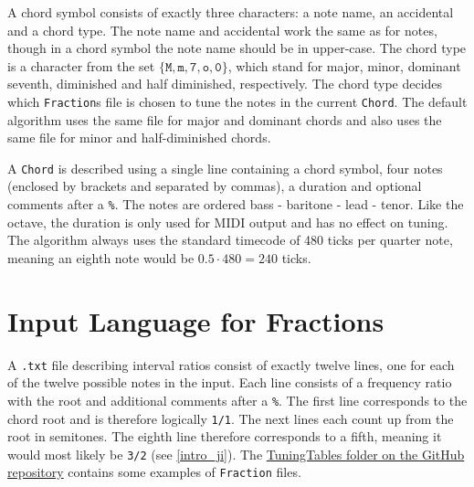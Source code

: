 \documentclass[a4paper]{article}
\begin{document}
\begin{appendices}
A chord symbol consists of exactly three characters: a note name, an accidental and a chord type. The note name and accidental work the same as for notes, though in a chord symbol the note name should be in upper-case. The chord type is a character from the set $\{\texttt{M}, \texttt{m}, \texttt{7}, \texttt{o}, \texttt{0}\}$, which stand for major, minor, dominant seventh, diminished and half diminished, respectively. The chord type decides which \texttt{Fraction}s file is chosen to tune the notes in the current \texttt{Chord}. The default algorithm uses the same file for major and dominant chords and also uses the same file for minor and half-diminished chords.

A \texttt{Chord} is described using a single line containing a chord symbol, four notes (enclosed by brackets and separated by commas), a duration and optional comments after a \texttt{\%}. The notes are ordered bass - baritone - lead - tenor. Like the octave, the duration is only used for MIDI output and has no effect on tuning. The algorithm always uses the standard \cite{dobrian_timing_2014} timecode of 480 ticks per quarter note, meaning an eighth note would be $0.5 \cdot 480 = 240$ ticks.

\section{Input Language for Fractions}
\label{input_fractions}
A \texttt{.txt} file describing interval ratios consist of exactly twelve lines, one for each of the twelve possible notes in the input. Each line consists of a frequency ratio with the root and additional comments after a \texttt{\%}. The first line corresponds to the chord root and is therefore logically \texttt{1/1}. The next lines each count up from the root in semitones. The eighth line therefore corresponds to a fifth, meaning it would most likely be \texttt{3/2} (see \ref{intro_ji}). The \href{https://github.com/teuncb/AdaptiveBarbershop/tree/main/TuningTables}{TuningTables folder on the GitHub repository} contains some examples of \texttt{Fraction} files.

\end{appendices}
\end{document}
